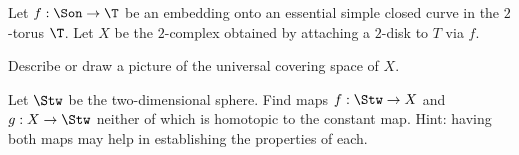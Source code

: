 Let $f:\Son\rightarrow \T$ be an embedding onto an essential simple
closed curve in the $2$-torus $\T$. Let $X$ be the $2$-complex
obtained by attaching a $2$-disk to $T$ via $f$.
\begin{alist}
\item Describe or draw a picture of the universal covering space of $X$.
\item Let $\Stw$ be the two-dimensional sphere. Find maps
$f:\Stw\rightarrow X$ and $g:X\rightarrow \Stw$ neither of which is
homotopic to the constant map. Hint: having both maps may help in
establishing the properties of each.
\end{alist}
